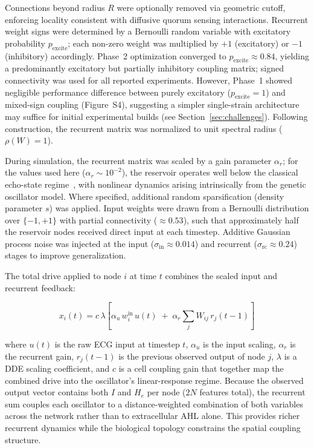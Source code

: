 \documentclass[journal=asbcd6,manuscript=article,keywords]{achemso}
\begin{document}
Connections beyond radius $R$ were optionally removed via geometric cutoff, enforcing locality consistent with diffusive quorum sensing interactions. 
Recurrent weight signs were determined by a Bernoulli random variable with excitatory probability $p_{\mathrm{excite}}$; each non-zero weight was multiplied by $+1$ (excitatory) or $-1$ (inhibitory) accordingly. 
Phase~2 optimization converged to $p_{\mathrm{excite}} \approx 0.84$, yielding a predominantly excitatory but partially inhibitory coupling matrix; signed connectivity was used for all reported experiments.
However, Phase~1 showed negligible performance difference between purely excitatory ($p_{\mathrm{excite}} = 1$) and mixed-sign coupling (Figure~S4), suggesting a simpler single-strain architecture may suffice for initial experimental builds (see Section~\ref{sec:challenges}).
Following construction, the recurrent matrix was normalized to unit spectral radius ($\rho(W) = 1$).

During simulation, the recurrent matrix was scaled by a gain parameter $\alpha_r$; for the values used here ($\alpha_r \sim 10^{-2}$), the reservoir operates well below the classical echo-state regime~\cite{Jaeger2001,Nakajima2020}, with nonlinear dynamics arising intrinsically from the genetic oscillator model. 
Where specified, additional random sparsification (density parameter $s$) was applied.
Input weights were drawn from a Bernoulli distribution over $\{-1, +1\}$ with partial connectivity ($\approx 0.53$), such that approximately half the reservoir nodes received direct input at each timestep.
Additive Gaussian process noise was injected at the input ($\sigma_{\mathrm{in}} \approx 0.014$) and recurrent ($\sigma_{\mathrm{rc}} \approx 0.24$) stages to improve generalization.

The total drive applied to node $i$ at time $t$ combines the scaled input and recurrent feedback:

\begin{equation}
x_i(t) = c \, \lambda \!\left[\alpha_u \, w^{\mathrm{in}}_i \, u(t) \;+\; \alpha_r \sum_j W_{ij} \, r_j(t{-}1)\right]
\end{equation}

where $u(t)$ is the raw ECG input at timestep $t$, $\alpha_u$ is the input scaling, $\alpha_r$ is the recurrent gain, $r_j(t{-}1)$ is the previous observed output of node $j$, $\lambda$ is a DDE scaling coefficient, and $c$ is a cell coupling gain that together map the combined drive into the oscillator's linear-response regime.
Because the observed output vector contains both $I$ and $H_e$ per node ($2N$ features total), the recurrent sum couples each oscillator to a distance-weighted combination of both variables across the network rather than to extracellular AHL alone. 
This provides richer recurrent dynamics while the biological topology constrains the spatial coupling structure.
\end{document}
